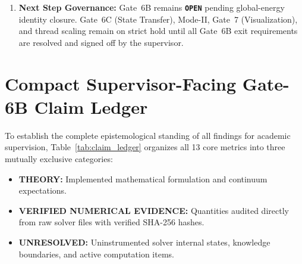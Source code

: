 \begin{enumerate}
  \item \textbf{Next Step Governance:} Gate~6B remains \textbf{\texttt{OPEN}} pending global-energy identity closure. Gate~6C (State Transfer), Mode-II, Gate~7 (Visualization), and thread scaling remain on strict hold until all Gate~6B exit requirements are resolved and signed off by the supervisor.
\end{enumerate}

\section{Compact Supervisor-Facing Gate-6B Claim Ledger}
\label{sec:claim_ledger}

To establish the complete epistemological standing of all findings for academic supervision, Table~\ref{tab:claim_ledger} organizes all 13 core metrics into three mutually exclusive categories:
\begin{itemize}
  \item \textbf{THEORY:} Implemented mathematical formulation and continuum expectations.
  \item \textbf{VERIFIED NUMERICAL EVIDENCE:} Quantities audited directly from raw solver files with verified SHA-256 hashes.
  \item \textbf{UNRESOLVED:} Uninstrumented solver internal states, knowledge boundaries, and active computation items.
\end{itemize}

